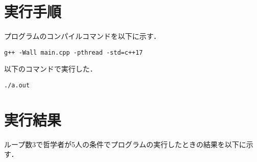 \documentclass[a4paper,dvipdfmx]{jsarticle}
\begin{document}
\section{実行手順}
    プログラムのコンパイルコマンドを以下に示す．
    \begin{lstlisting}[caption=コンパイル,label=build]
        g++ -Wall main.cpp -pthread -std=c++17
    \end{lstlisting}\par
    以下のコマンドで実行した．
    \begin{lstlisting}[caption=実行コマンド,label=run]
        ./a.out
    \end{lstlisting}

\section{実行結果}
    ループ数3で哲学者が5人の条件でプログラムの実行したときの結果を以下に示す．
\end{document}
